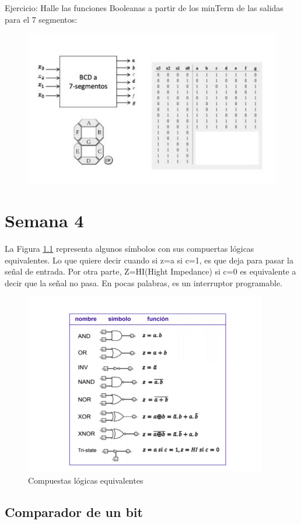 \documentclass[12pt,letterpaper]{book}
\begin{document}
Ejercicio: Halle las funciones Booleanas a partir de los minTerm de las salidas para el 7 segmentos:

\begin{figure}[H]
\centering
\includegraphics[width=.5\linewidth]{figures/tabBoo6.png}
\caption{}
\label{tabBoo6}
\end{figure}
\vspace{0.2cm}




\chapter{Semana 4}
La Figura \ref{p1} representa algunos símbolos con sus compuertas lógicas equivalentes. Lo que quiere decir cuando si z=a si c=1, es que deja para pasar la señal de entrada. Por otra parte, Z=HI(Hight Impedance) si c=0 es equivalente a decir que la señal no pasa. En pocas palabras, es un interruptor programable.

\begin{figure}[H]
\centering
\includegraphics[width=.5\linewidth]{figures/p1.png}
\caption{Compuestas lógicas equivalentes}
\label{p1}
\end{figure}
\vspace{0.2cm}

\section{Comparador de un bit}
\end{document}
